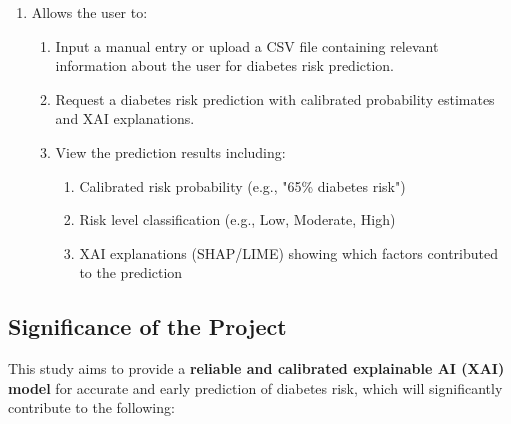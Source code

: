 \begin{enumerate}
    \item Allows the user to:
	\begin{enumerate}
    \item Input a manual entry or upload a CSV file containing relevant information about the user for diabetes risk prediction.
    \item Request a diabetes risk prediction with calibrated probability estimates and XAI explanations.
    \item View the prediction results including:
    \begin{enumerate}
        \item Calibrated risk probability (e.g., "65\% diabetes risk")
        \item Risk level classification (e.g., Low, Moderate, High)
        \item XAI explanations (SHAP/LIME) showing which factors contributed to the prediction
    \end{enumerate}
\end{enumerate}
\end{enumerate}


\subsection{Significance of the Project}

This study aims to provide a \textbf{reliable and calibrated explainable AI (XAI) model} for accurate and early prediction of diabetes risk, which will significantly contribute to the following:

